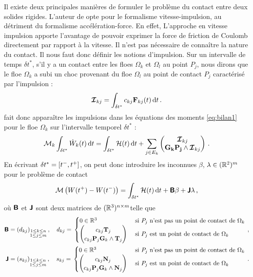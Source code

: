 Il existe deux principales manières de formuler le problème du contact entre deux solides rigides. L'auteur de \parencite{rabatel2015thesis} opte pour le formalisme vitesse-impulsion, au détriment du formalisme accélération-force. En effet, L’approche en vitesse impulsion apporte l’avantage de pouvoir exprimer la force de friction de Coulomb directement par rapport à la vitesse. Il n’est pas nécessaire de connaître la nature du contact. Il nous faut donc définir les notions d'impulsion. Sur un intervalle de temps $\delta t^*$, s’il y a un contact entre les floes $\Omega_k$ et $\Omega_l$ au point $P_j$, nous dirons que le floe $\Omega_k$ a subi un choc provenant du floe $\Omega_l$ au point de contact $P_j$ caractérisé par l’impulsion :
$$
\bvec{\mathcal{I}}_{kj} = \int_{\delta t^*} c_{kj} \bvec{F}_{kj}(t) \diff t \,.
$$ 
\citeauthor{rabatel2015thesis} fait donc apparaître les impulsions dans les équations des moments \cref{eq:bilan1} pour le floe $\Omega_k$ sur l’intervalle temporel $\delta t^*$ :
$$
\mathcal{M}_k \int_{\dtstar} \dot{W}_k(t) \diff t = \int_{\dtstar} \mathcal{H}(t) \diff t + \sum_{j \in E_k} \begin{pmatrix}
    \bvec{\mathcal{I}}_{kj} \\ \bvec{G_kP_j} \wedge \bvec{\mathcal{I}}_{kj} 
\end{pmatrix} \,.
$$
En écrivant $\delta t^* = [t^{-}, t^{+}]$, on peut donc introduire les inconnues $\beta$, $\lambda \in (\mathbb{R}^2)^m$ pour le problème de contact  
\begin{align}
    \mathcal{M} \left( W(t^{+}) - W(t^{-}) \right) = \int_{\dtstar} \mathcal{H}(t) \diff t + \bmat{B}\beta + \bmat{J}\lambda \,,
\end{align}
où $\bm{\mathsf{B}}$ et $\bm{\mathsf{J}}$ sont deux matrices de $(\mathbb{R}^3)^{n \times m}$telle que
\begin{align*}
    \bm{\mathsf{B}} = (d_{kj})_{\substack{1 \leq k \leq n \\ 1 \leq j \leq m}} \,, \quad d_{kj} = \,
    \begin{cases}
        0 \in \mathbb{R}^3 &\text{ si } P_j \text{ n'est pas un point de contact de } \Omega_k \\
        \begin{pmatrix}
            c_{kj} \bm{\mathrm{T}}_{j} \\ c_{kj} \bm{\mathrm{P}}_j\bm{\mathrm{G}}_k \wedge \bm{\mathrm{T}}_j 
        \end{pmatrix} &\text{ si } P_j \text{ est un point de contact de } \Omega_k
    \end{cases} \,, \\
    \bm{\mathsf{J}} = (s_{kj})_{\substack{1 \leq k \leq n \\ 1 \leq j \leq m}} \,, \quad s_{kj} = \,
    \begin{cases}
        0 \in \mathbb{R}^3 &\text{ si } P_j \text{ n'est pas un point de contact de } \Omega_k \\
        \begin{pmatrix}
            c_{kj} \bm{\mathrm{N}}_{j} \\ c_{kj} \bm{\mathrm{P}}_j\bm{\mathrm{G}}_k \wedge \bm{\mathrm{N}}_j 
        \end{pmatrix} &\text{ si } P_j \text{ est un point de contact de } \Omega_k
    \end{cases} \,.
\end{align*}
